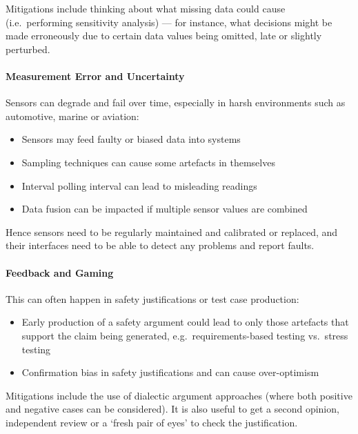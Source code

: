 Mitigations include thinking about what missing data could cause (i.e.\ performing sensitivity analysis) --- for instance, what decisions might be made erroneously due to certain data values being omitted, late or slightly perturbed.

\paragraph{Measurement Error and Uncertainty}\label{bkm:dark10}
Sensors can degrade and fail over time, especially in harsh environments such as automotive, marine or aviation:
\begin{itemize}
\item Sensors may feed faulty or biased data into systems
  \item Sampling techniques can cause some artefacts in themselves
  \item Interval polling interval can lead to misleading readings
  \item Data fusion can be impacted if multiple sensor values are combined
\end{itemize}

Hence sensors need to be regularly maintained and calibrated or replaced, and their interfaces need to be able to detect any problems and report faults. 

\paragraph{Feedback and Gaming}\label{bkm:dark11}
This can often happen in safety justifications or test case production:
\begin{itemize}
\item Early production of a safety argument could lead to only those artefacts that support the claim being generated, e.g.\ requirements-based testing vs.\ stress testing
  \item Confirmation bias in safety justifications and can cause over-optimism
\end{itemize}

Mitigations include the use of dialectic argument approaches (where both positive and negative cases can be considered). It is also useful to get a second opinion, independent review or a ‘fresh pair of eyes’ to check the justification.

